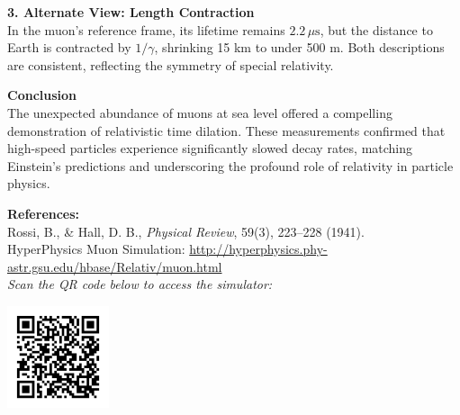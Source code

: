 \begin{technical}
    \noindent\textbf{3. Alternate View: Length Contraction}\\[0.5em]
    In the muon’s reference frame, its lifetime remains $2.2\,\mu\text{s}$, but the distance to Earth is contracted by $1/\gamma$, shrinking 15 km to under 500 m. Both descriptions are consistent, reflecting the symmetry of special relativity.

    \noindent\textbf{Conclusion}\\[0.5em]
    The unexpected abundance of muons at sea level offered a compelling demonstration of relativistic time dilation. These measurements confirmed that high-speed particles experience significantly slowed decay rates, matching Einstein’s predictions and underscoring the profound role of relativity in particle physics.

    \vspace{0.5em}
    \noindent\textbf{References:}\\
    Rossi, B., \& Hall, D. B., \textit{Physical Review}, 59(3), 223–228 (1941).\\    
    HyperPhysics Muon Simulation: \url{http://hyperphysics.phy-astr.gsu.edu/hbase/Relativ/muon.html}\\
    
    \textit{Scan the QR code below to access the simulator:} \\

    \begin{center}
    \includegraphics[width=3cm]{19_CosmicRayMuons/no_customization_frame.pdf} 
    \end{center}
\end{technical}